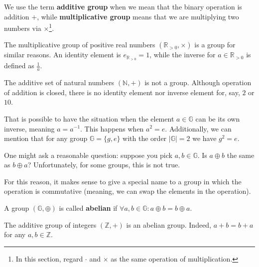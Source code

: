 \documentclass[../lecture-notes.tex]{subfiles}
\begin{document}
\begin{remark}
    We use the term \textbf{additive group} when we mean that the binary operation is addition $+$, while \textbf{multiplicative group} means that we are multiplying two numbers via $\times$\footnote{In this section, regard $\cdot$ and $\times$ as the same operation of multiplication.}.
\end{remark}

\begin{example}
    The multiplicative group of positive real numbers $(\mathbb{R}_{> 0}, \times)$ is a group for similar reasons. An identity element is $e_{\mathbb{R}_{>0}} = 1$, while the inverse for $a \in \mathbb{R}_{>0}$ is defined as $\frac{1}{a}$.
\end{example}

\begin{example}
    The additive set of natural numbers $(\mathbb{N}, +)$ is not a group. Although operation of addition is closed, there is no identity element nor inverse element for, say, $2$ or $10$.
\end{example}

\begin{example}
    That is possible to have the situation when the element $a \in \mathbb{G}$ can be its own inverse, meaning $a = a^{-1}$. This happens when $a^2 = e$. Additionally, we can mention that for any group $\mathbb{G} = \{g, e\}$ with the order $|\mathbb{G}| = 2$ we have $g^2 = e$.
\end{example}

One might ask a reasonable question: suppose you pick $a,b \in \mathbb{G}$. Is $a \oplus b$ the same as $b \oplus a$? Unfortunately, for some groups, this is not true. 

For this reason, it makes sense to give a special name to a group in which the operation is commutative (meaning, we can swap the elements in the operation).

\begin{definition}
    A group $(\mathbb{G},\oplus)$ is called \textbf{abelian} if $\forall a,b \in \mathbb{G}: a \oplus b = b \oplus a$.
\end{definition}

\begin{example}
    The additive group of integers $(\mathbb{Z},+)$ is an abelian group. Indeed, $a + b = b + a$ for any $a,b \in \mathbb{Z}$.
\end{example}
\end{document}
